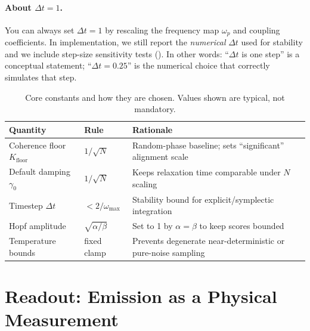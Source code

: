 \documentclass[11pt,a4paper]{article}
\newcommand{\dt}{\Delta t}
\newcommand{\damp}{\gamma}
\begin{document}
\paragraph{About $\dt=1$.}
You can always set $\dt=1$ by rescaling the frequency map $\omega_p$ and coupling coefficients. In implementation, we still report the \emph{numerical} $\dt$ used for stability and we include step-size sensitivity tests (). In other words: ``$\dt$ is one step'' is a conceptual statement; ``$\dt=0.25$'' is the numerical choice that correctly simulates that step.

\begin{table}[H]
  \centering
  \caption{Core constants and how they are chosen. Values shown are typical, not mandatory.}
  \label{tab:constants}
  \renewcommand{\arraystretch}{1.15}
  \begin{adjustbox}{max width=\textwidth}
  \begin{tabular}{P{0.23\textwidth} P{0.27\textwidth} P{0.42\textwidth}}
    \toprule
    \textbf{Quantity} & \textbf{Rule} & \textbf{Rationale} \\
    \midrule
    Coherence floor $K_{\mathrm{floor}}$ & $1/\sqrt{N}$ & Random-phase baseline; sets ``significant'' alignment scale \\
    Default damping $\damp_0$ & $1/\sqrt{N}$ & Keeps relaxation time comparable under $N$ scaling \\
    Timestep $\dt$ & $<2/\omega_{\max}$ & Stability bound for explicit/symplectic integration \\
    Hopf amplitude & $\sqrt{\alpha/\beta}$ & Set to 1 by $\alpha=\beta$ to keep scores bounded \\
    Temperature bounds & fixed clamp & Prevents degenerate near-deterministic or pure-noise sampling \\
    \bottomrule
  \end{tabular}
  \end{adjustbox}
\end{table}






\section{Readout: Emission as a Physical Measurement}
\label{sec:readout}
\end{document}
